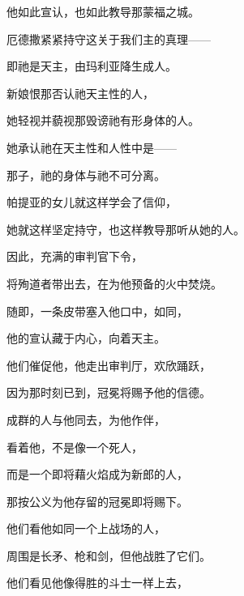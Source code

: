 他如此宣认，也如此教导那蒙福之城。\par

厄德撒紧紧持守这关于我们主的真理——\par

即祂是天主，由玛利亚降生成人。\par

新娘恨那否认祂天主性的人，\par

她轻视并藐视那毁谤祂有形身体的人。\par

她承认祂在天主性和人性中是——\par

那子，祂的身体与祂不可分离。\par

帕提亚的女儿就这样学会了信仰，\par

她就这样坚定持守，也这样教导那听从她的人。\par

因此，充满的审判官下令，\par

将殉道者带出去，在为他预备的火中焚烧。\par

随即，一条皮带塞入他口中，如同，\par

他的宣认藏于内心，向着天主。\par

他们催促他，他走出审判厅，欢欣踊跃，\par

因为那时刻已到，冠冕将赐予他的信德。\par

成群的人与他同去，为他作伴，\par

看着他，不是像一个死人，\par

而是一个即将藉火焰成为新郎的人，\par

那按公义为他存留的冠冕即将赐下。\par

他们看他如同一个上战场的人，\par

周围是长矛、枪和剑，但他战胜了它们。\par

他们看见他像得胜的斗士一样上去，\par

